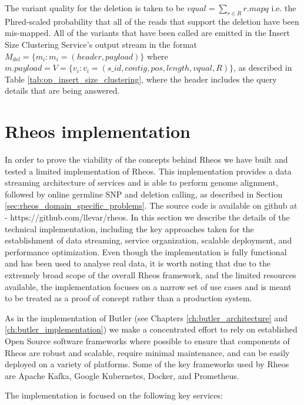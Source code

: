 The variant quality for the deletion is taken to be $vqual = \sum_{r \in R}{r.mapq}$ i.e. the Phred-scaled probability that all of the reads that support the deletion have been mis-mapped. All of the variants that have been called are emitted in the Insert Size Clustering Service's output stream in the format $M_{del} = \{m_i: m_i = (header, payload)\}$ where $m.payload = V = \{v_i: v_i = (s\_id, contig, pos, length, vqual, R)\}$, as described in Table \ref{tab:op_insert_size_clustering}, where the header includes the query details that are being answered.


\section{Rheos implementation}\label{sec:rheos_implementation}

In order to prove the viability of the concepts behind Rheos we have built and tested a limited implementation of Rheos. This implementation provides a data streaming architecture of services and is able to perform genome alignment, followed by online germline SNP and deletion calling, as described in Section \ref{sec:rheos_domain_specific_problems}. The source code is available on github at - https://github.com/llevar/rheos. In this section we describe the details of the technical implementation, including the key approaches taken for the establishment of data streaming, service organization, scalable deployment, and performance optimization. Even though the implementation is fully functional and has been used to analyse real data, it is worth noting that due to the extremely broad scope of the overall Rheos framework, and the limited resources available, the implementation focuses on a narrow set of use cases and is meant to be treated as a proof of concept rather than a production system.

As in the implementation of Butler (see Chapters \ref{ch:butler_architecture} and \ref{ch:butler_implementation}) we make a concentrated effort to rely on established Open Source software frameworks where possible to ensure that components of Rheos are robust and scalable, require minimal maintenance, and can be easily deployed on a variety of platforms. Some of the key frameworks used by Rheos are Apache Kafka, Google Kubernetes, Docker, and Prometheus.

The implementation is focused on the following key services:

